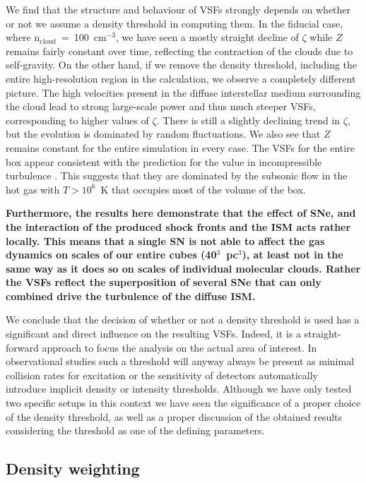 We find that the structure and behaviour of VSFs strongly depends on whether or not we assume a density threshold in computing them.
In the fiducial case, where n$_\mathrm{cloud}$~=~100~cm$^{-3}$, we have seen a mostly straight decline of $\zeta$ while $Z$ remains fairly constant over time, reflecting the contraction of the clouds due to self-gravity.
On the other hand, if we remove the density threshold, including the entire high-resolution region in the calculation, we observe a completely different picture.
The high velocities present in the diffuse interstellar medium surrounding the cloud lead to strong large-scale power and thus much steeper VSFs, corresponding to higher values of $\zeta$. 
There is still a slightly declining trend in $\zeta$, but the evolution is dominated by random fluctuations.
We also see that $Z$ remains constant for the entire simulation in every case.
The VSFs for the entire box appear consistent with the prediction for the value in incompressible turbulence \citep{Boldyrev2002}. 
This suggests that they are dominated by the subsonic flow in the hot gas with $T > 10^6$~K that occupies most of the volume of the box.

\textbf{
    Furthermore, the results here demonstrate that the effect of SNe, and the interaction of the produced shock fronts and the ISM acts rather locally. 
    This means that a single SN is not able to affect the gas dynamics on scales of our entire cubes (40$^3$~pc$^3$), at least not in the same way as it does so on scales of individual molecular clouds.
    Rather the VSFs reflect the superposition of several SNe that can only combined drive the turbulence of the diffuse ISM.
}

We conclude that the decision of whether or not a density threshold is used has a significant and direct influence on the resulting VSFs.
Indeed, it is a straight-forward approach to focus the analysis on the actual area of interest.
In observational studies such a threshold will anyway always be present as minimal collision rates for excitation or the sensitivity of detectors automatically introduce implicit density or intensity thresholds. 
Although we have only tested two specific setups in this context we have seen the significance of a proper choice of the density threshold, as well as a proper discussion of the obtained results considering the threshold as one of the defining parameters.




\subsection{Density weighting}\label{discussion:densweight}


